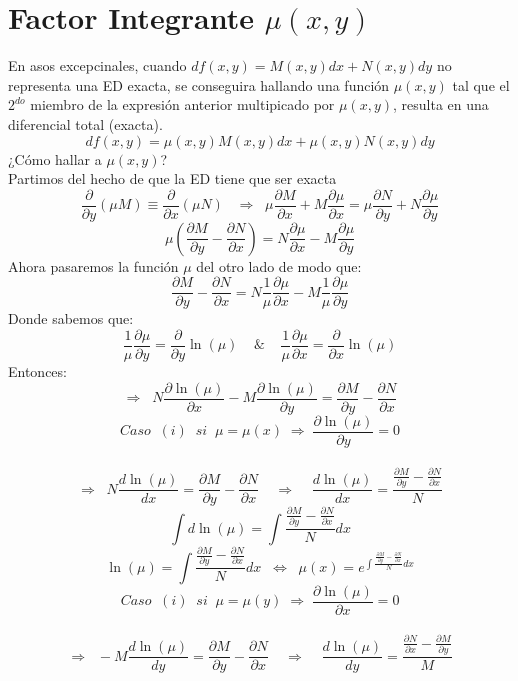 \documentclass[10pt,executivepaper]{article}
\begin{document}
\section{Factor Integrante $\mu(x,y)$}
En asos excepcinales, cuando $df(x,y)=M(x,y)dx+N(x,y)dy$ no representa una ED exacta, se conseguira hallando una función $\mu(x,y)$ tal que el $2^{do}$ miembro de la expresión anterior multipicado por $\mu(x,y)$, resulta en una diferencial total (exacta).
\[df(x,y)=\mu(x,y)M(x,y)dx+\mu(x,y)N(x,y)dy\]
¿Cómo hallar a $\mu(x,y)$?\\
Partimos del hecho de que la ED tiene que ser exacta
\[\frac{\partial}{\partial{y}}(\mu M)\equiv \frac{\partial}{\partial{x}}(\mu N)\;\;\;\Rightarrow\;\;\mu\frac{\partial{M}}{\partial{x}}+M\frac{\partial{\mu}}{\partial{x}}=\mu\frac{\partial{N}}{\partial{y}}+N\frac{\partial{\mu}}{\partial{y}}\]
\[\mu\left(\frac{\partial{M}}{\partial{y}}-\frac{\partial{N}}{\partial{x}}\right)=N\frac{\partial{\mu}}{\partial{x}}-M\frac{\partial{\mu}}{\partial{y}}\]
Ahora pasaremos la función $\mu$ del otro lado de modo que:
\[\frac{\partial{M}}{\partial{y}}-\frac{\partial{N}}{\partial{x}}=N\frac{1}{\mu}\frac{\partial{\mu}}{\partial{x}}-M\frac{1}{\mu}\frac{\partial{\mu}}{\partial{y}}\]
Donde sabemos que:
\[\frac{1}{\mu}\frac{\partial{\mu}}{\partial{y}}=\frac{\partial}{\partial{y}}\ln(\mu)\;\;\;\;\&\;\;\;\;\frac{1}{\mu}\frac{\partial{\mu}}{\partial{x}}=\frac{\partial}{\partial{x}}\ln(\mu)\]
Entonces:
\[\Rightarrow\;\;N\frac{\partial{\ln(\mu)}}{\partial{x}}-M\frac{\partial{\ln(\mu)}}{\partial{y}}=\frac{\partial{M}}{\partial{y}}-\frac{\partial{N}}{\partial{x}}\]
\vspace{0.5cm}
\[Caso\;\;(i)\;\;si\;\;\mu=\mu(x)\;\Rightarrow\;\frac{\partial{\ln(\mu)}}{\partial{y}}=0\]\\
\[\Rightarrow\;\;N\frac{d\ln(\mu)}{dx}=\frac{\partial{M}}{\partial{y}}-\frac{\partial{N}}{\partial{x}}\;\;\;\;\Rightarrow\;\;\;\;\frac{d\ln(\mu)}{dx}=\frac{\frac{\partial{M}}{\partial{y}}-\frac{\partial{N}}{\partial{x}}}{N}\]
\[\int d\ln(\mu)=\int\frac{\frac{\partial{M}}{\partial{y}}-\frac{\partial{N}}{\partial{x}}}{N}dx\]
\[\ln(\mu)=\int\frac{\frac{\partial{M}}{\partial{y}}-\frac{\partial{N}}{\partial{x}}}{N}dx\;\;\Leftrightarrow\;\;\mu(x)=e^{\int{\frac{\frac{\partial{M}}{\partial{y}}-\frac{\partial{N}}{\partial{x}}}{N}dx}}\]
\vspace{1cm}
\[Caso\;\;(i)\;\;si\;\;\mu=\mu(y)\;\Rightarrow\;\frac{\partial{\ln(\mu)}}{\partial{x}}=0\]\\
\[\Rightarrow\;\;-M\frac{d\ln(\mu)}{dy}=\frac{\partial{M}}{\partial{y}}-\frac{\partial{N}}{\partial{x}}\;\;\;\;\Rightarrow\;\;\;\;\frac{d\ln(\mu)}{dy}=\frac{\frac{\partial{N}}{\partial{x}}-\frac{\partial{M}}{\partial{y}}}{M}\]
\end{document}
